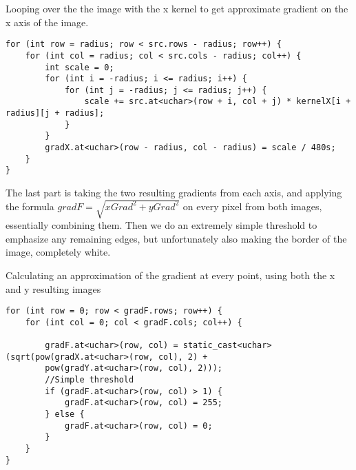 \begin{listing}[H]
	\caption{Looping over the the image with the x kernel to get approximate gradient on the x axis of the image.}
	\label{listing:xLoop}
	\begin{verbatim}
for (int row = radius; row < src.rows - radius; row++) {
	for (int col = radius; col < src.cols - radius; col++) {
		int scale = 0;
		for (int i = -radius; i <= radius; i++) {
			for (int j = -radius; j <= radius; j++) {
				scale += src.at<uchar>(row + i, col + j) * kernelX[i + radius][j + radius];
			}
		}
		gradX.at<uchar>(row - radius, col - radius) = scale / 480s;
	}
}
	\end{verbatim}
\end{listing}

The last part is taking the two resulting gradients from each axis, and applying the formula $gradF = \sqrt{xGrad^2+yGrad^2}$ on every pixel from both images, essentially combining them. Then we do an extremely simple threshold to emphasize any remaining edges, but unfortunately also making the border of the image, completely white.

\begin{listing}[H]
	\caption{Calculating an approximation of the gradient at every point, using both the x and y resulting images}
	\label{listing:finalGradient}
	\begin{verbatim}
for (int row = 0; row < gradF.rows; row++) {
	for (int col = 0; col < gradF.cols; col++) {
		
		gradF.at<uchar>(row, col) = static_cast<uchar>(sqrt(pow(gradX.at<uchar>(row, col), 2) +
		pow(gradY.at<uchar>(row, col), 2)));
		//Simple threshold
		if (gradF.at<uchar>(row, col) > 1) {
			gradF.at<uchar>(row, col) = 255;
		} else {
			gradF.at<uchar>(row, col) = 0;
		}
	}
}
	\end{verbatim}
\end{listing}
